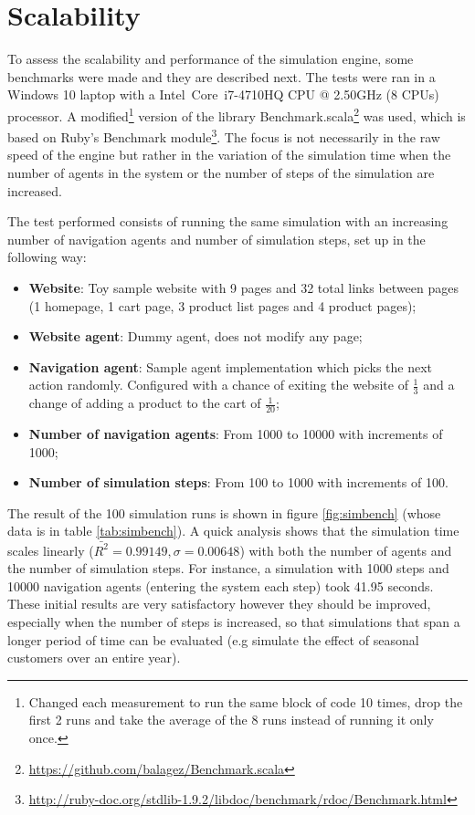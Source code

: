 \section{Scalability}\label{sec:scalability}

To assess the scalability and performance of the simulation engine, some 
benchmarks were made and they are described next. The tests were ran in a 
Windows 10 laptop with a Intel\textregistered~Core\texttrademark~i7-4710HQ CPU 
@ 2.50GHz (8 CPUs) processor. A modified\footnote{Changed each measurement to 
run the same block of code 10 times, drop the first 2 runs and take the average 
of the 8 runs instead of running it only once.} version of the library 
Benchmark.scala\footnote{\url{https://github.com/balagez/Benchmark.scala}} was 
used, which is based on Ruby's Benchmark 
module\footnote{\url{http://ruby-doc.org/stdlib-1.9.2/libdoc/benchmark/rdoc/Benchmark.html}}.
 The focus is not necessarily in the raw speed of the engine but rather in the 
variation of the simulation time when the number of agents in the system or the 
number of steps of the simulation are increased.

The test performed consists of running the same simulation with an 
increasing number of navigation agents and number of simulation steps, set up 
in the following way:

\begin{itemize}
    \item \textbf{Website}: Toy sample website with 9 pages and 32 total links 
    between pages (1 homepage, 1 cart page, 3 product list pages and 4 product 
    pages);
    \item \textbf{Website agent}: Dummy agent, does not modify any page;
    \item \textbf{Navigation agent}: Sample agent implementation which 
    picks the next action randomly. Configured with a chance of exiting the 
    website of $\frac{1}{3}$ and a change of adding a product to the cart of 
    $\frac{1}{20}$;
    \item \textbf{Number of navigation agents}: From 1000 to 10000 with 
    increments of 1000;
    \item \textbf{Number of simulation steps}: From 100 to 1000 with increments 
    of 100.
\end{itemize}

The result of the 100 simulation runs is shown in figure \ref{fig:simbench} 
(whose data is in table \ref{tab:simbench}). A quick analysis shows that the 
simulation time scales linearly ($\bar{R^{2}} = 0.99149, \sigma = 0.00648$) 
with both the number of agents and the number of simulation steps. For 
instance, a simulation with 1000 steps and 10000 navigation agents (entering 
the system each step)	 took 41.95 seconds. These initial results are very 
satisfactory however they should be improved, especially when the number of 
steps is increased, so that simulations that span a longer period of time can 
be evaluated (e.g simulate the effect of seasonal customers over an entire 
year).

